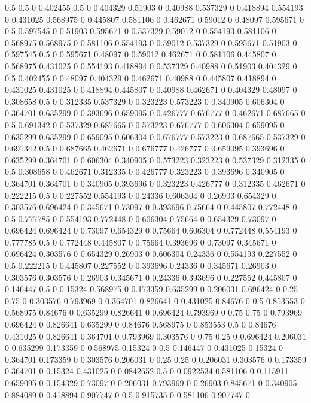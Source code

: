 0.5 0.5 0
0.402455 0.5 0
0.404329 0.51903 0
0.40988 0.537329 0
0.418894 0.554193 0
0.431025 0.568975 0
0.445807 0.581106 0
0.462671 0.59012 0
0.48097 0.595671 0
0.5 0.597545 0
0.51903 0.595671 0
0.537329 0.59012 0
0.554193 0.581106 0
0.568975 0.568975 0
0.581106 0.554193 0
0.59012 0.537329 0
0.595671 0.51903 0
0.597545 0.5 0
0.595671 0.48097 0
0.59012 0.462671 0
0.581106 0.445807 0
0.568975 0.431025 0
0.554193 0.418894 0
0.537329 0.40988 0
0.51903 0.404329 0
0.5 0.402455 0
0.48097 0.404329 0
0.462671 0.40988 0
0.445807 0.418894 0
0.431025 0.431025 0
0.418894 0.445807 0
0.40988 0.462671 0
0.404329 0.48097 0
0.308658 0.5 0
0.312335 0.537329 0
0.323223 0.573223 0
0.340905 0.606304 0
0.364701 0.635299 0
0.393696 0.659095 0
0.426777 0.676777 0
0.462671 0.687665 0
0.5 0.691342 0
0.537329 0.687665 0
0.573223 0.676777 0
0.606304 0.659095 0
0.635299 0.635299 0
0.659095 0.606304 0
0.676777 0.573223 0
0.687665 0.537329 0
0.691342 0.5 0
0.687665 0.462671 0
0.676777 0.426777 0
0.659095 0.393696 0
0.635299 0.364701 0
0.606304 0.340905 0
0.573223 0.323223 0
0.537329 0.312335 0
0.5 0.308658 0
0.462671 0.312335 0
0.426777 0.323223 0
0.393696 0.340905 0
0.364701 0.364701 0
0.340905 0.393696 0
0.323223 0.426777 0
0.312335 0.462671 0
0.222215 0.5 0
0.227552 0.554193 0
0.24336 0.606304 0
0.26903 0.654329 0
0.303576 0.696424 0
0.345671 0.73097 0
0.393696 0.75664 0
0.445807 0.772448 0
0.5 0.777785 0
0.554193 0.772448 0
0.606304 0.75664 0
0.654329 0.73097 0
0.696424 0.696424 0
0.73097 0.654329 0
0.75664 0.606304 0
0.772448 0.554193 0
0.777785 0.5 0
0.772448 0.445807 0
0.75664 0.393696 0
0.73097 0.345671 0
0.696424 0.303576 0
0.654329 0.26903 0
0.606304 0.24336 0
0.554193 0.227552 0
0.5 0.222215 0
0.445807 0.227552 0
0.393696 0.24336 0
0.345671 0.26903 0
0.303576 0.303576 0
0.26903 0.345671 0
0.24336 0.393696 0
0.227552 0.445807 0
0.146447 0.5 0
0.15324 0.568975 0
0.173359 0.635299 0
0.206031 0.696424 0
0.25 0.75 0
0.303576 0.793969 0
0.364701 0.826641 0
0.431025 0.84676 0
0.5 0.853553 0
0.568975 0.84676 0
0.635299 0.826641 0
0.696424 0.793969 0
0.75 0.75 0
0.793969 0.696424 0
0.826641 0.635299 0
0.84676 0.568975 0
0.853553 0.5 0
0.84676 0.431025 0
0.826641 0.364701 0
0.793969 0.303576 0
0.75 0.25 0
0.696424 0.206031 0
0.635299 0.173359 0
0.568975 0.15324 0
0.5 0.146447 0
0.431025 0.15324 0
0.364701 0.173359 0
0.303576 0.206031 0
0.25 0.25 0
0.206031 0.303576 0
0.173359 0.364701 0
0.15324 0.431025 0
0.0842652 0.5 0
0.0922534 0.581106 0
0.115911 0.659095 0
0.154329 0.73097 0
0.206031 0.793969 0
0.26903 0.845671 0
0.340905 0.884089 0
0.418894 0.907747 0
0.5 0.915735 0
0.581106 0.907747 0
